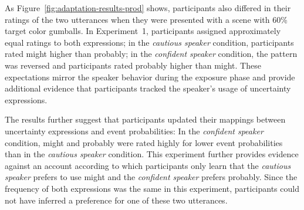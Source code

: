 \documentclass[man, floatsintext]{apa6}
\begin{document}
As Figure~\ref{fig:adaptation-results-prod} shows, participants also differed in their ratings of the two utterances when they were presented with a scene with 60\% target color gumballs. In Experiment~1, participants assigned approximately equal ratings to both expressions; in the \emph{cautious speaker} condition, participants rated {\sc might} higher than {\sc probably}; in the \emph{confident speaker} condition, the pattern was reversed and participants rated {\sc probably} higher than {\sc might}. These expectations mirror the speaker behavior during the exposure phase and provide additional evidence that participants tracked the speaker's usage of uncertainty expressions. 


The results further suggest that participants updated their mappings between uncertainty expressions and event probabilities: In the {\it confident speaker} condition, {\sc might} and {\sc probably} were rated highly for lower event probabilities than in the {\it cautious speaker} condition. This experiment further provides evidence against an account according to which participants only learn that the \emph{cautious speaker} prefers to use {\sc might} and the {\it confident speaker} prefers {\sc probably}. Since the frequency of both expressions was the same in this experiment, participants could not have inferred a preference for one of these two utterances. 

\end{document}
